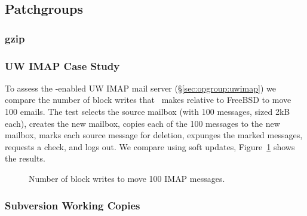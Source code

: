 \subsection {Patchgroups}

\subsubsection {gzip}

\subsubsection {UW IMAP Case Study}
\label{sec:evaluation:uwimap}
To assess the \opgroup-enabled UW IMAP mail server
(\S\ref{sec:opgroup:uwimap}) we compare the number of block writes
that \Kudos\ makes relative to FreeBSD to move 100 emails. The test
selects the source mailbox (with 100 messages, sized 2kB each),
creates the new mailbox, copies each of the 100 messages to the new
mailbox, marks each source message for deletion, expunges the marked
messages, requests a check, and logs out. We compare using soft updates,
Figure~\ref{fig:imap-compare} shows the results.

\begin{figure}[htb]
\caption{\label{fig:imap-compare} Number of block writes to move 100
  IMAP messages.}
\end{figure}

\subsubsection {Subversion Working Copies}
